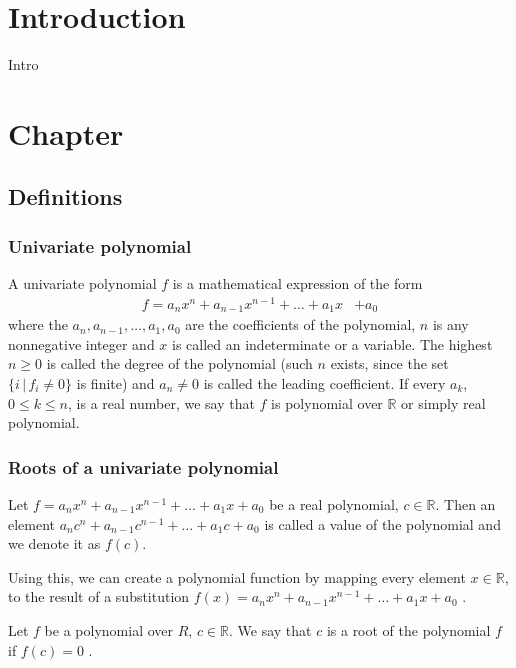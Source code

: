 \documentclass[
  digital, %
  table,   %
  nolof,     %
  nolot,     %
	draft, %
]{fithesis3}
\begin{document}
\newtheorem{theorem}{Theorem}[section] %
\chapter{Introduction}
Intro

\chapter{Chapter}
\section{Definitions}
\subsection{Univariate polynomial}
A univariate polynomial $f$ is a mathematical expression of the form
\begin{align}
       f = a_{n}x^{n}  +  a_{n-1}x^{n-1} +  \ldots  +  a_{1}x  &+  a_{0} \label{eq:polynom}
\end{align}
\newcommand{\R}{\mathbb{R}}
where the $a_{n}, a_{n-1}, \ldots, a_{1}, a_{0}$  are the coefficients of the polynomial, $n$ is any nonnegative integer and $x$ is called an indeterminate or a variable.  The highest $n \geq 0$ is called the degree of the polynomial (such $n$ exists, since the set $\{i \, | \, f_{i} \neq 0 \}$ is finite) and $a_{n} \neq 0$ is called the leading coefficient. If every $a_{k}$, $0\leq{k}\leq{n}$, is a real number, we say that $f$ is polynomial over $\R$ or simply real polynomial.

\subsection{Roots of a univariate polynomial}
Let $f = a_{n}x^{n}  +  a_{n-1}x^{n-1} +  \ldots  +  a_{1}x  +  a_{0}$ be a real polynomial, $c\in\R$. Then an element $a_{n}c^{n}  +  a_{n-1}c^{n-1} +  \ldots  +  a_{1}c  +  a_{0}$ is called a value of the polynomial and we denote it as $f(c)$.

Using this, we can create a polynomial function by mapping every element $x\in\R$, to the result of a substitution $f(x) = a_{n}x^{n}  +  a_{n-1}x^{n-1} +  \ldots  +  a_{1}x  +  a_{0}$ \parencite{polynomialsChina}.

Let $f$ be a polynomial over $R$, $c\in\R$. We say that $c$ is a root of the polynomial $f$ if $f(c) = 0$ \parencite{rosicky07}.
\end{document}
